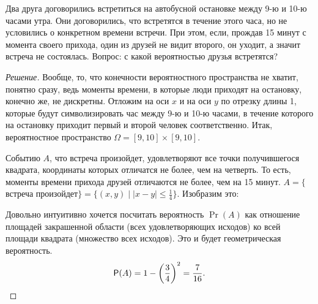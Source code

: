 \begin{problem}
    Два друга договорились встретиться на автобусной остановке между 9-ю и 10-ю часами утра. Они договорились, что встретятся в течение этого часа, но не условились о конкретном времени встречи. При этом, если, прождав 15 минут с момента своего прихода, один из друзей не видит второго, он уходит, а значит встреча не состоялась. Вопрос: с какой вероятностью друзья встретятся?
\end{problem}
\begin{proof}[Решение]
    Вообще, то, что конечности вероятностного пространства не хватит, понятно сразу, ведь моменты времени, в которые люди приходят на остановку, конечно же, не дискретны. 
    Отложим на оси \(x\) и на оси \(y\) по отрезку длины 1, которые будут символизировать час между 9-ю и 10-ю часами, в течение которого на остановку приходит первый и второй человек соответственно. Итак, вероятностное пространство \(\Omega = [9, 10] \times [9, 10].\) 
    
    Событию \(A\), что встреча произойдет, удовлетворяют все точки получившегося квадрата, координаты которых отличатся не более, чем на четверть. То есть, моменты времени прихода друзей отличаются не более, чем на 15 минут. \(A = \{\)встреча произойдет\(\} = \{(x, y) \mid |x - y| \leq \frac{1}{4}\} \). Изобразим это:
    
    \begin{center}
    \end{center}
    
    Довольно интуитивно хочется посчитать вероятность $ \Pr(A) $ как отношение площадей закрашенной области (всех удовлетворяющих исходов) ко всей площади квадрата (множество всех исходов). Это и будет геометрическая вероятность. 
    \[
    \Pr(A) = 1 - \left(\frac{3}{4} \right)^2 = \frac{7}{16}. \qedhere
    \]
    
    
\end{proof}